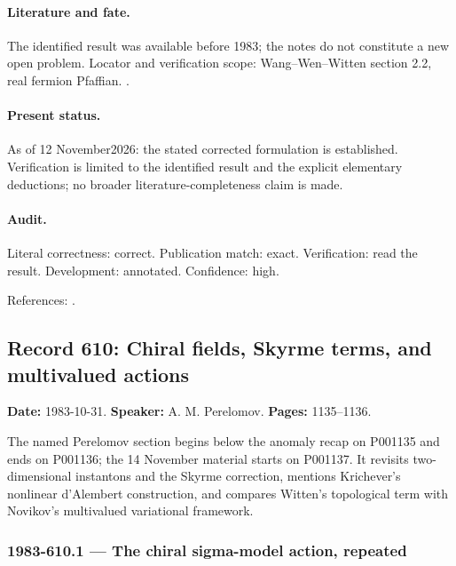 \paragraph{Literature and fate.} The identified result was available before 1983; the notes do not constitute a new open problem. Locator and verification scope: Wang--Wen--Witten section 2.2, real fermion Pfaffian. \cite{witten1982anomaly,wangwenwitten2019new}.

\paragraph{Present status.} As of 12 November2026: the stated corrected formulation is established. Verification is limited to the identified result and the explicit elementary deductions; no broader literature-completeness claim is made.

\paragraph{Audit.} Literal correctness: correct. Publication match: exact. Verification: read the result. Development: annotated. Confidence: high.

\noindent References: \citep{witten1982anomaly,wangwenwitten2019new}.\par

\subsection{Record 610: Chiral fields, Skyrme terms, and multivalued actions}

\label{talk:610}

\noindent\textbf{Date:} 1983-10-31. \textbf{Speaker:} A. M. Perelomov. \textbf{Pages:} 1135--1136.\par

The named Perelomov section begins below the anomaly recap on P001135 and ends on P001136; the 14 November material starts on P001137. It revisits two-dimensional instantons and the Skyrme correction, mentions Krichever's nonlinear d'Alembert construction, and compares Witten's topological term with Novikov's multivalued variational framework.

\subsubsection{1983-610.1 --- The chiral sigma-model action, repeated}

\label{item:1983-610.1}

